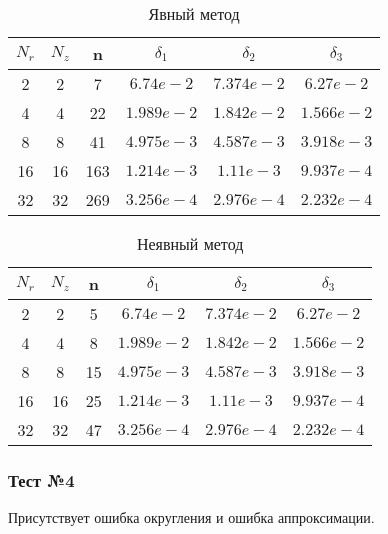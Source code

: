 \begin{table}[H]
  \begin{center}
    \begin{tabular}{*{6}c}
      \toprule
      $ N_r $ & $ N_z $ & n & $ \delta_1 $ & $ \delta_2 $ & $ \delta_3 $ \\
      \midrule
      2 & 2 & 7 & $6.74e-2 $ & $7.374e-2 $ & $6.27e-2 $ \\
      4 & 4 & 22 & $1.989e-2 $ & $1.842e-2 $ & $1.566e-2 $ \\
      8 & 8 & 41 & $4.975e-3 $ & $4.587e-3 $ & $3.918e-3 $ \\
      16 & 16 & 163& $1.214e-3 $ & $1.11e-3 $ & $9.937e-4 $ \\
      32 & 32 & 269 & $3.256e-4 $ & $2.976e-4 $ & $2.232e-4 $ \\
      \bottomrule
    \end{tabular}
    \caption{Явный метод}
  \end{center}
\end{table}
  
\begin{table}[H]
  \begin{center}
    \begin{tabular}{*{6}c}
      \toprule
      $ N_r $ & $ N_z $ & n & $ \delta_1 $ & $ \delta_2 $ & $ \delta_3 $ \\
      \midrule
      2 & 2 & 5 & $6.74e-2 $ & $7.374e-2 $ & $6.27e-2 $  \\
      4 & 4 & 8 & $1.989e-2 $ & $1.842e-2 $ & $1.566e-2 $ \\
      8 & 8 & 15 & $4.975e-3 $ & $4.587e-3 $ & $3.918e-3 $ \\
      16 & 16 & 25 & $1.214e-3 $ & $1.11e-3 $ & $9.937e-4 $ \\
      32 & 32 & 47 & $3.256e-4 $ & $2.976e-4 $ & $2.232e-4 $ \\
      \bottomrule
    \end{tabular}
    \caption*{Неявный метод}
  \end{center}
\end{table}

\subsubsection*{Тест №4}

Присутствует ошибка округления и ошибка аппроксимации.

